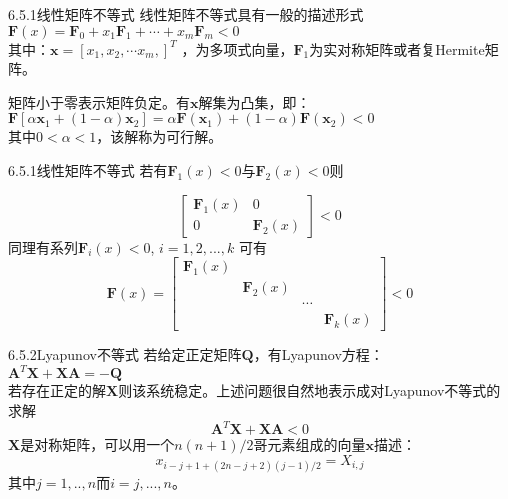 \documentclass[12pt]{beamer}
\begin{document}
\begin{frame}[allowframebreaks]{6.5.1线性矩阵不等式}
线性矩阵不等式具有一般的描述形式
\\$\boldsymbol{F}\left ( x\right )=\boldsymbol{F}_{0}+x_{1}\boldsymbol{F}_{1}+\cdots +x_{m}\boldsymbol{F}_{m}< 0$
\\其中：$\boldsymbol{x}=\left [ x_{1},x_{2},\cdots x_{m},\right ]^{T}$ ，为多项式向量，$\boldsymbol{F}_{1}$为实对称矩阵或者复Hermite矩阵。

矩阵小于零表示矩阵负定。有$\boldsymbol{x}$解集为凸集，即：
\\$ \boldsymbol{F}\left [ \alpha \boldsymbol{x}_{1}+\left ( 1-\alpha \right )\boldsymbol{x}_{2}\right ]=\alpha \boldsymbol{F}\left ( \boldsymbol{x}_{1} \right ) +\left ( 1-\alpha \right )\boldsymbol{F}\left ( \boldsymbol{x}_{2} \right )< 0$
\\其中$0< \alpha < 1$，该解称为可行解。


\end{frame}

\begin{frame}[allowframebreaks]{6.5.1线性矩阵不等式}
若有$\boldsymbol{F}_{1}\left ( x\right )< 0$与$\boldsymbol{F}_{2}\left ( x\right )< 0$则

\[\begin{bmatrix}
\boldsymbol{F}_{1}\left ( x\right ) & 0\\ 
0 & \boldsymbol{F}_{2}\left ( x\right )
\end{bmatrix}< 0\]
同理有系列$\boldsymbol{F}_{i}\left ( x\right )< 0$, $i=1,2,...,k$
可有\[\boldsymbol{F}\left ( x\right )=\begin{bmatrix}
\boldsymbol{F}_{1}\left ( x\right ) &  &  & \\ 
&  \boldsymbol{F}_{2}\left ( x\right ) & & \\ 
&  & \cdots & \\ 
&  &  & \boldsymbol{F}_{k}\left ( x\right )
\end{bmatrix}< 0\]
\end{frame}

\begin{frame}[allowframebreaks]{6.5.2Lyapunov不等式}
若给定正定矩阵$\boldsymbol{Q}$，有Lyapunov方程：
\\$\boldsymbol{A}^{T}\boldsymbol{X}+\boldsymbol{X}\boldsymbol{A}=-\boldsymbol{Q}$
\\若存在正定的解$\boldsymbol{X}$则该系统稳定。上述问题很自然地表示成对Lyapunov不等式的求解\[\boldsymbol{A}^{T}\boldsymbol{X}+\boldsymbol{X}\boldsymbol{A}< 0\]
$\boldsymbol{X}$是对称矩阵，可以用一个$n\left ( n+1\right )/2$哥元素组成的向量$\boldsymbol{x}$描述：
\[x_{i-j+1+\left ( 2n-j+2\right )\left ( j-1\right )/2}=X_{i,j}\]
其中$j=1,..,n$而$i=j,...,n$。
\end{frame}
\end{document}
